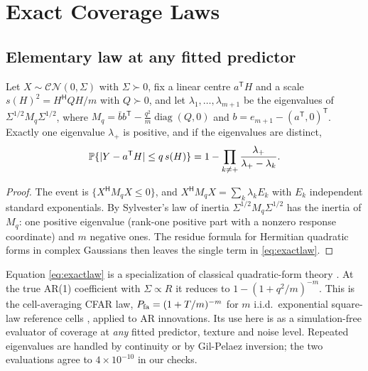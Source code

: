 \section{Exact Coverage Laws}
\subsection{Elementary law at any fitted predictor}
\begin{proposition}\label{prop:law}
Let $X\sim\mathcal{CN}(0,\Sigma)$ with $\Sigma\succ0$, fix a linear centre $a^{\mathsf T}H$ and a scale $s(H)^2=H^{\mathsf H}QH/m$ with $Q\succ0$, and let $\lambda_1,\dots,\lambda_{m+1}$ be the eigenvalues of $\Sigma^{1/2}M_q\Sigma^{1/2}$, where $M_q=\bar bb^{\mathsf T}-\frac{q^2}{m}\operatorname{diag}(Q,0)$ and $b=e_{m+1}-(a^{\mathsf T},0)^{\mathsf T}$. Exactly one eigenvalue $\lambda_+$ is positive, and if the eigenvalues are distinct,
\begin{equation}
\mathbb{P}\{|Y-a^{\mathsf T}H|\le q\,s(H)\}=1-\prod_{k\ne+}\frac{\lambda_+}{\lambda_+-\lambda_k}.
\label{eq:exactlaw}
\end{equation}
\end{proposition}
\begin{proof}
The event is $\{X^{\mathsf H}M_qX\le0\}$, and $X^{\mathsf H}M_qX=\sum_k\lambda_k E_k$ with $E_k$ independent standard exponentials. By Sylvester's law of inertia $\Sigma^{1/2}M_q\Sigma^{1/2}$ has the inertia of $M_q$: one positive eigenvalue (rank-one positive part with a nonzero response coordinate) and $m$ negative ones. The residue formula for Hermitian quadratic forms in complex Gaussians \cite{alnaffouri2016} then leaves the single term in \eqref{eq:exactlaw}.
\end{proof}
Equation \eqref{eq:exactlaw} is a specialization of classical quadratic-form theory \cite{imhof1961,alnaffouri2016}. At the true AR(1) coefficient with $\Sigma\propto R$ it reduces to $1-(1+q^2/m)^{-m}$. This is the cell-averaging CFAR law, $P_{\rm fa}=(1+T/m)^{-m}$ for $m$ i.i.d.\ exponential square-law reference cells \cite{finn1968,gandhi1988}, applied to AR innovations. Its use here is as a simulation-free evaluator of coverage at \emph{any} fitted predictor, texture and noise level. Repeated eigenvalues are handled by continuity or by Gil-Pelaez inversion; the two evaluations agree to $4\times10^{-10}$ in our checks.

